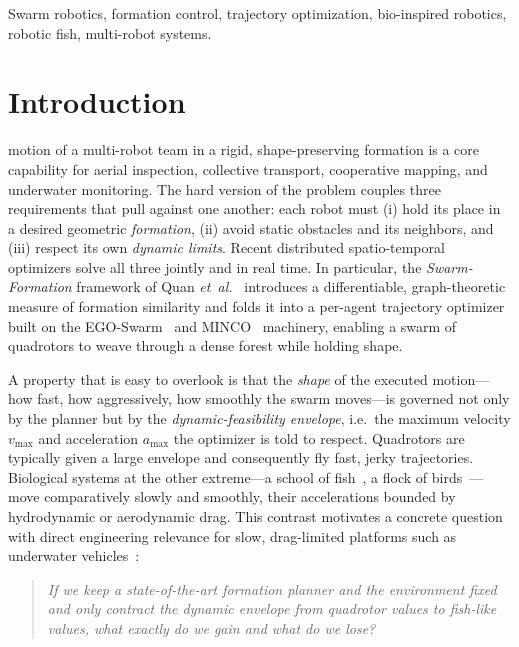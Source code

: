 \documentclass[journal]{IEEEtran}
\begin{document}
\begin{IEEEkeywords}
Swarm robotics, formation control, trajectory optimization, bio-inspired
robotics, robotic fish, multi-robot systems.
\end{IEEEkeywords}

\IEEEpeerreviewmaketitle

\section{Introduction}
 motion of a multi-robot team in a rigid,
shape-preserving formation is a core capability for aerial inspection,
collective transport, cooperative mapping, and underwater monitoring. The
hard version of the problem couples three requirements that pull against
one another: each robot must (i) hold its place in a desired geometric
\emph{formation}, (ii) avoid static obstacles and its neighbors, and
(iii) respect its own \emph{dynamic limits}. Recent distributed
spatio-temporal optimizers solve all three jointly and in real time. In
particular, the \emph{Swarm-Formation} framework of Quan
\emph{et~al.}~\cite{quan2022distributed,quan2023robust} introduces a
differentiable, graph-theoretic measure of formation similarity and folds
it into a per-agent trajectory optimizer built on the
EGO-Swarm~\cite{zhou2021egoswarm} and MINCO~\cite{wang2022geometrically}
machinery, enabling a swarm of quadrotors to weave through a dense forest
while holding shape.

A property that is easy to overlook is that the \emph{shape} of the executed
motion---how fast, how aggressively, how smoothly the swarm moves---is
governed not only by the planner but by the \emph{dynamic-feasibility
envelope}, i.e.\ the maximum velocity $v_{\max}$ and acceleration $a_{\max}$
the optimizer is told to respect. Quadrotors are typically given a large
envelope and consequently fly fast, jerky trajectories. Biological systems
at the other extreme---a school of fish~\cite{katz2011inferring}, a flock of
birds~\cite{reynolds1987flocks}---move comparatively slowly and smoothly,
their accelerations bounded by hydrodynamic or aerodynamic drag. This
contrast motivates a concrete question with direct engineering relevance for
slow, drag-limited platforms such as underwater
vehicles~\cite{berlinger2021implicit,scharff2018sensing}:

\begin{quote}
\emph{If we keep a state-of-the-art formation planner and the environment
fixed and only contract the dynamic envelope from quadrotor values to
fish-like values, what exactly do we gain and what do we lose?}
\end{quote}
\end{document}
